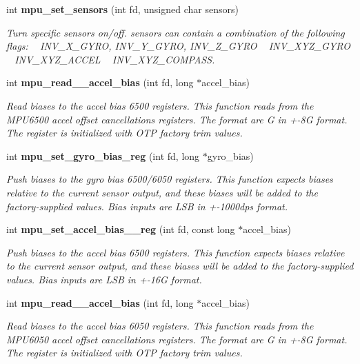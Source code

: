 \begin{DoxyCompactItemize}
int \textbf{ mpu\+\_\+set\+\_\+sensors} (int fd, unsigned char sensors)
\begin{DoxyCompactList}\small\item\em Turn specific sensors on/off. {\itshape sensors} can contain a combination of the following flags\+: ~\newline
 I\+N\+V\+\_\+\+X\+\_\+\+G\+Y\+RO, I\+N\+V\+\_\+\+Y\+\_\+\+G\+Y\+RO, I\+N\+V\+\_\+\+Z\+\_\+\+G\+Y\+RO ~\newline
 I\+N\+V\+\_\+\+X\+Y\+Z\+\_\+\+G\+Y\+RO ~\newline
 I\+N\+V\+\_\+\+X\+Y\+Z\+\_\+\+A\+C\+C\+EL ~\newline
 I\+N\+V\+\_\+\+X\+Y\+Z\+\_\+\+C\+O\+M\+P\+A\+SS. \end{DoxyCompactList}\item 
int \textbf{ mpu\+\_\+read\+\_\+\_\+accel\+\_\+bias} (int fd, long $\ast$accel\+\_\+bias)
\begin{DoxyCompactList}\small\item\em Read biases to the accel bias 6500 registers. This function reads from the M\+P\+U6500 accel offset cancellations registers. The format are G in +-\/8G format. The register is initialized with O\+TP factory trim values. \end{DoxyCompactList}\item 
int \textbf{ mpu\+\_\+set\+\_\+gyro\+\_\+bias\+\_\+reg} (int fd, long $\ast$gyro\+\_\+bias)
\begin{DoxyCompactList}\small\item\em Push biases to the gyro bias 6500/6050 registers. This function expects biases relative to the current sensor output, and these biases will be added to the factory-\/supplied values. Bias inputs are L\+SB in +-\/1000dps format. \end{DoxyCompactList}\item 
int \textbf{ mpu\+\_\+set\+\_\+accel\+\_\+bias\+\_\+\_\+reg} (int fd, const long $\ast$accel\+\_\+bias)
\begin{DoxyCompactList}\small\item\em Push biases to the accel bias 6500 registers. This function expects biases relative to the current sensor output, and these biases will be added to the factory-\/supplied values. Bias inputs are L\+SB in +-\/16G format. \end{DoxyCompactList}\item 
int \textbf{ mpu\+\_\+read\+\_\+\_\+accel\+\_\+bias} (int fd, long $\ast$accel\+\_\+bias)
\begin{DoxyCompactList}\small\item\em Read biases to the accel bias 6050 registers. This function reads from the M\+P\+U6050 accel offset cancellations registers. The format are G in +-\/8G format. The register is initialized with O\+TP factory trim values. \end{DoxyCompactList}\item 

\end{DoxyCompactItemize}
